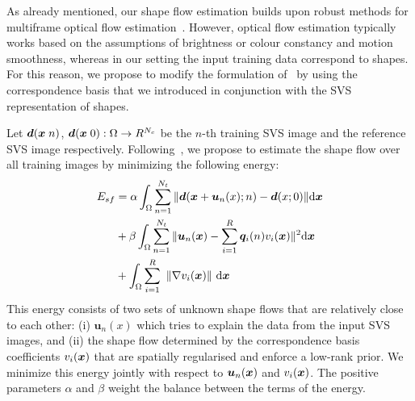 
As already mentioned, our shape flow estimation builds upon robust methods for multiframe optical flow estimation~\cite{Garg:2013hu}. However, optical flow estimation typically works based on the assumptions of brightness or colour constancy and motion smoothness, whereas in our setting the input training data correspond to shapes. For this reason, we propose to modify the formulation of~\cite{Garg:2013hu} by using the correspondence basis that we introduced in conjunction with the SVS representation of shapes.


%


Let $\bm{d}(\bm{x}\;n)$, $\bm{d}(\bm{x}\;0):\Omega\rightarrow R^{N_c}$ be the $n$-th training SVS image and the reference SVS image respectively. Following~\cite{Garg:2013hu}, we propose to estimate the shape flow over all training images by minimizing the following energy:
\begin{align}
E_{sf} & =\alpha
\int_{\Omega}\sum_{n=1}^{N_t} \|\bm{d}(\bm{x}+\bm{u}_n(x);n)-\bm{d}(x;0)\| \mathrm{d} \bm{x} \label{eq:costfunc}\\
    &+ \beta \int_{\Omega}\sum_{n=1}^{N_t}\|\bm{u}_n(\bm{x})-\sum_{i=1}^R\bm{q}_i(n)v_i(\bm{x})\|^2 \mathrm{d} \bm{x} \label{eq:lowrank}\\
    &+
\int_\Omega  \sum_{i=1}^R \,\, \left \|    \nabla v_i(\bm{x})    \right \|  \,\mathrm{d} \bm{x} \label{eq:TVterm}
\end{align}
This energy consists of two sets of unknown shape flows that are relatively close to each other: (i) $\bm{u}_n(x)$ which tries to explain the data from the input SVS images, and (ii) the shape flow determined by the correspondence basis coefficients $v_i(\bm{x})$ that are spatially regularised and enforce a low-rank prior. We minimize this energy jointly with respect to $\bm{u}_n(\bm{x})$ and $v_i(\bm{x})$. The positive parameters $\alpha$ and $\beta$ weight the balance between the terms of the energy.


